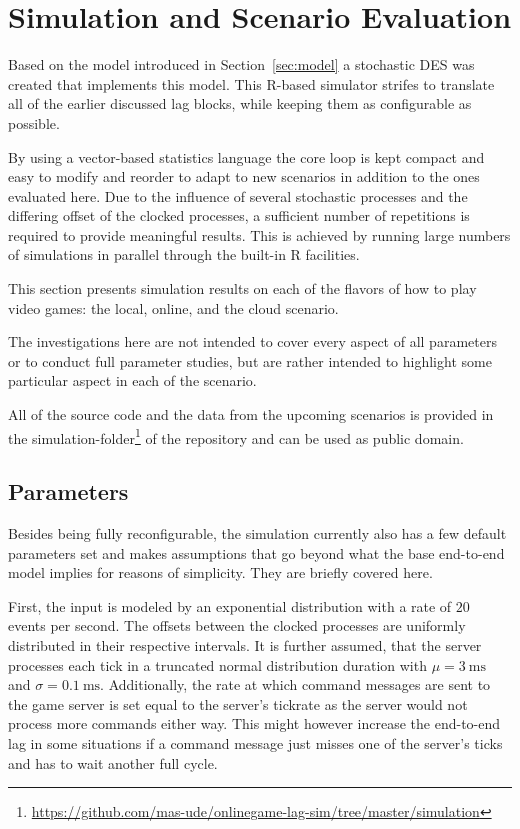 \section{Simulation and Scenario Evaluation}
\label{sec:simulation}

Based on the model introduced in Section~\ref{sec:model} a stochastic \gls{DES} was created that implements this model. This R-based simulator strifes to translate all of the earlier discussed lag blocks, while keeping them as configurable as possible.

By using a vector-based statistics language the core loop is kept compact and easy to modify and reorder to adapt to new scenarios in addition to the ones evaluated here. Due to the influence of several stochastic processes and the differing offset of the clocked processes, a sufficient number of repetitions is required to provide meaningful results. This is achieved by running large numbers of simulations in parallel through the built-in R facilities.

This section presents simulation results on each of the flavors of how to play video games: the local, online, and the cloud scenario.

The investigations here are not intended to cover every aspect of all parameters or to conduct full parameter studies, but are rather intended to highlight some particular aspect in each of the scenario. 

All of the source code and the data from the upcoming scenarios is provided in the simulation-folder\footnote{\url{https://github.com/mas-ude/onlinegame-lag-sim/tree/master/simulation}} of the repository and can be used as public domain.


\subsection{Parameters}

Besides being fully reconfigurable, the simulation currently also has a few default parameters set and makes assumptions that go beyond what the base end-to-end model implies for reasons of simplicity. They are briefly covered here.

First, the input is modeled by an exponential distribution with a rate of $20$ events per second. The offsets between the clocked processes are uniformly distributed in their respective intervals. It is further assumed, that the server processes each tick in a truncated normal distribution duration with $\mu = \SI{3}{\milli\second}$ and $\sigma = \SI{0.1}{\milli\second}$.
Additionally, the rate at which command messages are sent to the game server is set equal to the server's tickrate as the server would not process more commands either way. This might however increase the end-to-end lag in some situations if a command message just misses one of the server's ticks and has to wait another full cycle.

